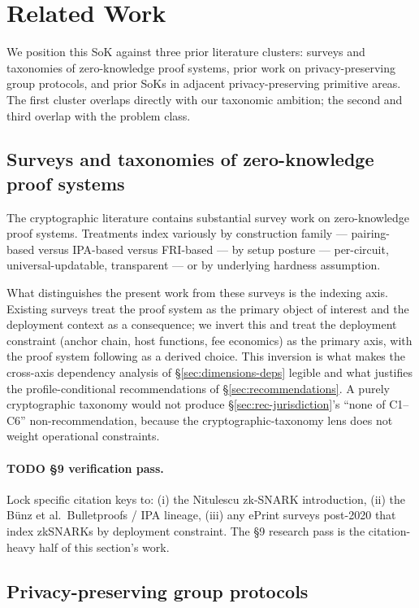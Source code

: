 \section{Related Work}
\label{sec:related}

We position this SoK against three prior literature clusters: surveys
and taxonomies of zero-knowledge proof systems, prior work on
privacy-preserving group protocols, and prior SoKs in adjacent
privacy-preserving primitive areas. The first cluster overlaps
directly with our taxonomic ambition; the second and third overlap
with the problem class.

\subsection{Surveys and taxonomies of zero-knowledge proof systems}

The cryptographic literature contains substantial survey work on
zero-knowledge proof systems. Treatments index variously by
construction family --- pairing-based versus IPA-based versus FRI-based
--- by setup posture --- per-circuit, universal-updatable, transparent
--- or by underlying hardness assumption.

What distinguishes the present work from these surveys is the
indexing axis. Existing surveys treat the proof system as the
primary object of interest and the deployment context as a
consequence; we invert this and treat the deployment constraint
(anchor chain, host functions, fee economics) as the primary axis,
with the proof system following as a derived choice. This inversion
is what makes the cross-axis dependency analysis of
\S\ref{sec:dimensions-deps} legible and what justifies the
profile-conditional recommendations of
\S\ref{sec:recommendations}. A purely cryptographic taxonomy would
not produce \S\ref{sec:rec-jurisdiction}'s ``none of C1--C6''
non-recommendation, because the cryptographic-taxonomy lens does not
weight operational constraints.

\paragraph{TODO §9 verification pass.} Lock specific citation
keys to: (i) the Nitulescu zk-SNARK introduction, (ii) the
B\"unz et al.\ Bulletproofs / IPA lineage, (iii) any
ePrint surveys post-2020 that index zkSNARKs by deployment
constraint. The §9 research pass is the
citation-heavy half of this section's work.

\subsection{Privacy-preserving group protocols}

